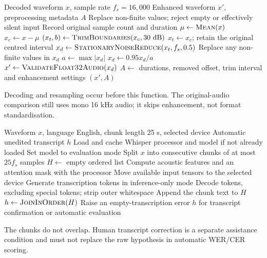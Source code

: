 \documentclass[11pt,a4paper]{article}
\begin{document}
\newpage
\begin{algorithm}[H]
\caption{Enhance a decoded mono 16 kHz waveform}
\label{alg:audio}
\begin{algorithmic}[1]
\Require Decoded waveform $x$, sample rate $f_s=16{,}000$
\Ensure Enhanced waveform $x'$, preprocessing metadata $A$
\State Replace non-finite values; reject empty or effectively silent input
\State Record original sample count and duration
\State $\mu\gets\Call{Mean}{x}$
\State $x_c\gets x-\mu$
\State $(x_t,b)\gets\Call{TrimBoundaries}{x_c,30\text{ dB}}$
  \State $x_t\gets x_c$; retain the original centred interval
\EndIf
\State $x_d\gets\Call{StationaryNoiseReduce}{x_t,f_s,0.5}$
\State Replace any non-finite values in $x_d$
\State $a\gets\max|x_d|$
  \State $x_d\gets0.95x_d/a$
\EndIf
\State $x'\gets\Call{ValidateFloat32Audio}{x_d}$
\State $A\gets$ durations, removed offset, trim interval and enhancement settings
\State \Return $(x',A)$
\end{algorithmic}
\end{algorithm}
Decoding and resampling occur before this function. The original-audio comparison
still uses mono 16 kHz audio; it skips enhancement, not format standardisation.

\newpage
\begin{algorithm}[H]
\caption{Transcribe audio with the reusable Whisper runtime}
\label{alg:whisper}
\begin{algorithmic}[1]
\Require Waveform $x$, language English, chunk length 25 s, selected device
\Ensure Automatic unedited transcript $h$
\State Load and cache Whisper processor and model if not already loaded
\State Set model to evaluation mode
\State Split $x$ into consecutive chunks of at most $25f_s$ samples
\State $H\gets$ empty ordered list
  \State Compute acoustic features and an attention mask with the processor
  \State Move available input tensors to the selected device
  \State Generate transcription tokens in inference-only mode
  \State Decode tokens, excluding special tokens; strip outer whitespace
    \State Append the chunk text to $H$
  \EndIf
\EndFor
\State $h\gets\Call{JoinInOrder}{H}$
  \State Raise an empty-transcription error
\EndIf
\State \Return $h$ for transcript confirmation or automatic evaluation
\end{algorithmic}
\end{algorithm}
The chunks do not overlap. Human transcript correction is a separate assistance
condition and must not replace the raw hypothesis in automatic WER/CER scoring.
\end{document}
